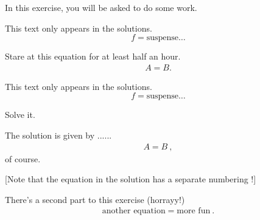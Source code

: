 \documentclass[11pt,a4paper]{article}
\begin{document}
\MakeUebungHeader



In this exercise, you will be asked to do some work.

\begin{onlymusterloesung}
  This text only appears in the solutions.
  \begin{equation}
    f = \text{suspense}\ldots
  \end{equation}
\end{onlymusterloesung}


\begin{exenumerate}
\item Stare at this equation for at least half an hour.
  \begin{align}
    A = B.
  \end{align}

  \begin{onlymusterloesung}
    This text only appears in the solutions.
    \begin{equation}
      f = \text{suspense}\ldots
    \end{equation}
  \end{onlymusterloesung}

\item Solve it.

  \begin{loesung}
    The solution is given by ...... 
    \begin{align}
      A=B\ ,
    \end{align}
    of course.

    [Note that the equation in the solution has a separate numbering !]
  \end{loesung}
\end{exenumerate}

There's a second part to this exercise (horrayy!)
\begin{align}
  \text{another equation} = \text{more fun}\ .
\end{align}

\exenumfull\label{expart:ThisIsALabelOutsideExenumEnvironment}
\end{document}
